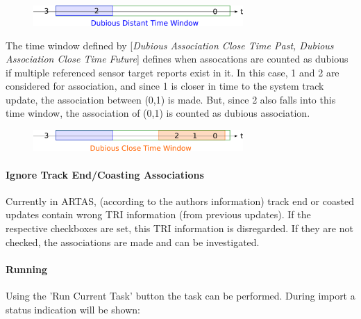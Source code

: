 \begin{figure}[H]
  \center
    \includegraphics[width=8cm]{figures/artas_assoc_dubious_distant_window.png}
\end{figure}


The time window defined by [\textit{Dubious Association Close Time Past, Dubious Association Close Time Future}] defines when assocations are counted as dubious if multiple referenced sensor target reports exist in it. In this case, 1 and 2 are considered for association, and since 1 is closer in time to the system track update, the association between (0,1) is made. But, since 2 also falls into this time window, the association of (0,1) is counted as dubious association.

\begin{figure}[H]
  \center
    \includegraphics[width=8cm]{figures/artas_assoc_dubious_close_window.png}
\end{figure}


\paragraph{Ignore Track End/Coasting Associations}

Currently in ARTAS, (according to the authors information) track end or coasted updates contain wrong TRI information (from previous updates). If the respective checkboxes are set, this TRI information is disregarded. If they are not checked, the associations are made and can be investigated.

\paragraph{Running}

Using the 'Run Current Task' button the task can be performed. During import a status indication will be shown:

